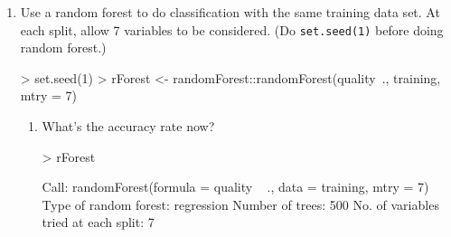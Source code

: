 \documentclass[12pt,a4paper]{paper}
\begin{document}
\begin{enumerate}
\begin{enumerate}
\begin{enumerate}
\item  What’s the training error rate?
\begin{Schunk}
\begin{Sinput}
> mean((wineData$quality - predict(treeModel))^2)
\end{Sinput}
\begin{Soutput}
[1] 0.4254908
\end{Soutput}
\end{Schunk}
\item  Randomly sample 1000 rows as training data and use tree method to do classification.
What’s the accuracy rate for test data? (Do \texttt{set.seed(1)} before sampling.)
\begin{Schunk}
\begin{Sinput}
> set.seed(1)
> n <- seq_len(nrow(wineData))
> training <- sample(n, size = 1000)
> testing <- n[!n %
> training <- wineData[training,]
> testing <- wineData[testing,]
> treeModel <- rpart::rpart(quality~., training)
> prediction <- predict(treeModel, newdata = testing[,-12])
> mean((testing$quality - prediction)^2)
\end{Sinput}
\begin{Soutput}
[1] 0.4353023
\end{Soutput}
\end{Schunk}
\end{enumerate}
\item Use a random forest to do classification with the same training data set. At each split,
allow 7 variables to be considered. (Do \texttt{set.seed(1)} before doing random forest.)
\begin{Schunk}
\begin{Sinput}
> set.seed(1)
> rForest <- randomForest::randomForest(quality~., training, mtry = 7)
\end{Sinput}
\end{Schunk}
\begin{enumerate}
\item What’s the accuracy rate now?
\begin{Schunk}
\begin{Sinput}
> rForest
\end{Sinput}
\begin{Soutput}
Call:
 randomForest(formula = quality ~ ., data = training, mtry = 7) 
               Type of random forest: regression
                     Number of trees: 500
No. of variables tried at each split: 7


\end{Soutput}
\end{Schunk}
\end{enumerate}
\end{enumerate}
\end{enumerate}
\end{document}
